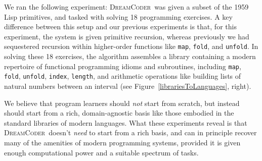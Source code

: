 \documentclass{article}
\newcommand{\system}{\textsc{DreamCoder}~}
\newcommand{\code}[1]{{\footnotesize\texttt{#1}}}
\begin{document}
We ran the following experiment: \system was given a subset of the
1959 Lisp primitives, and tasked with solving 18 programming
exercises. A key difference between this setup and our previous
experiments is that, for this experiment, the system is given
primitive recursion, whereas previously we had sequestered recursion
within higher-order functions like \code{map}, \code{fold}, and
\code{unfold}.  In solving these 18 exercises, the algorithm assembles
a library containing a modern repertoire of functional programming idioms
and subroutines, including \code{map}, \code{fold}, \code{unfold},
\code{index}, \code{length}, and arithmetic operations like building
lists of natural numbers between an interval (see
Figure~\ref{librariesToLanguages}, right).

We believe that program learners should \emph{not}
start from scratch,
but instead should start from
a rich, domain-agnostic
basis like those embodied in the standard libraries of modern  languages.
What these experiments reveal is that \system doesn't \emph{need} to start from a rich basis,
and can in principle recover many of the amenities of modern programming systems,
provided it is given enough computational power and a suitable
spectrum of tasks.
\end{document}
